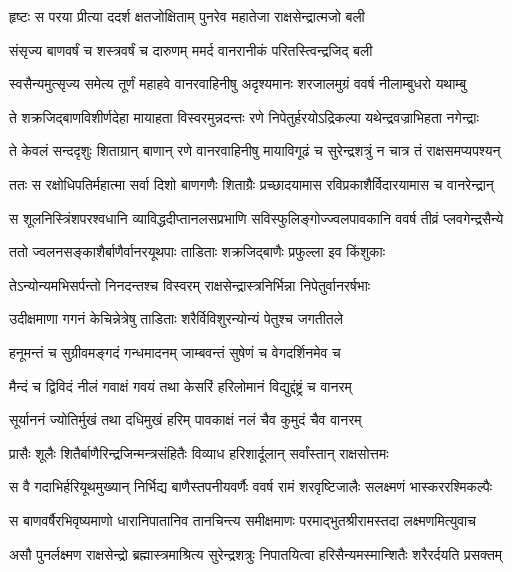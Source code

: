 \twolineshloka
{हृष्टः स परया प्रीत्या ददर्श क्षतजोक्षिताम्}
{पुनरेव महातेजा राक्षसेन्द्रात्मजो बली} %

\twolineshloka
{संसृज्य बाणवर्षं च शस्त्रवर्षं च दारुणम्}
{ममर्द वानरानीकं परितस्त्विन्द्रजिद् बली} %

\twolineshloka
{स्वसैन्यमुत्सृज्य समेत्य तूर्णं महाहवे वानरवाहिनीषु}
{अदृश्यमानः शरजालमुग्रं ववर्ष नीलाम्बुधरो यथाम्बु} %

\twolineshloka
{ते शक्रजिद्बाणविशीर्णदेहा मायाहता विस्वरमुन्नदन्तः}
{रणे निपेतुर्हरयोऽद्रिकल्पा यथेन्द्रवज्राभिहता नगेन्द्राः} %

\twolineshloka
{ते केवलं सन्ददृशुः शिताग्रान् बाणान् रणे वानरवाहिनीषु}
{मायाविगूढं च सुरेन्द्रशत्रुं न चात्र तं राक्षसमप्यपश्यन्} %

\twolineshloka
{ततः स रक्षोधिपतिर्महात्मा सर्वा दिशो बाणगणैः शिताग्रैः}
{प्रच्छादयामास रविप्रकाशैर्विदारयामास च वानरेन्द्रान्} %

\twolineshloka
{स शूलनिस्त्रिंशपरश्वधानि व्याविद्धदीप्तानलसप्रभाणि}
{सविस्फुलिङ्गोज्ज्वलपावकानि ववर्ष तीव्रं प्लवगेन्द्रसैन्ये} %

\twolineshloka
{ततो ज्वलनसङ्काशैर्बाणैर्वानरयूथपाः}
{ताडिताः शक्रजिद्बाणैः प्रफुल्ला इव किंशुकाः} %

\twolineshloka
{तेऽन्योन्यमभिसर्पन्तो निनदन्तश्च विस्वरम्}
{राक्षसेन्द्रास्त्रनिर्भिन्ना निपेतुर्वानरर्षभाः} %

\twolineshloka
{उदीक्षमाणा गगनं केचिन्नेत्रेषु ताडिताः}
{शरैर्विविशुरन्योन्यं पेतुश्च जगतीतले} %

\twolineshloka
{हनूमन्तं च सुग्रीवमङ्गदं गन्धमादनम्}
{जाम्बवन्तं सुषेणं च वेगदर्शिनमेव च} %

\twolineshloka
{मैन्दं च द्विविदं नीलं गवाक्षं गवयं तथा}
{केसरिं हरिलोमानं विद्युद्दंष्ट्रं च वानरम्} %

\twolineshloka
{सूर्याननं ज्योतिर्मुखं तथा दधिमुखं हरिम्}
{पावकाक्षं नलं चैव कुमुदं चैव वानरम्} %

\twolineshloka
{प्रासैः शूलैः शितैर्बाणैरिन्द्रजिन्मन्त्रसंहितैः}
{विव्याध हरिशार्दूलान् सर्वांस्तान् राक्षसोत्तमः} %

\twolineshloka
{स वै गदाभिर्हरियूथमुख्यान् निर्भिद्य बाणैस्तपनीयवर्णैः}
{ववर्ष रामं शरवृष्टिजालैः सलक्ष्मणं भास्कररश्मिकल्पैः} %

\twolineshloka
{स बाणवर्षैरभिवृष्यमाणो धारानिपातानिव तानचिन्त्य}
{समीक्षमाणः परमाद्भुतश्रीरामस्तदा लक्ष्मणमित्युवाच} %

\twolineshloka
{असौ पुनर्लक्ष्मण राक्षसेन्द्रो ब्रह्मास्त्रमाश्रित्य सुरेन्द्रशत्रुः}
{निपातयित्वा हरिसैन्यमस्मान्शितैः शरैरर्दयति प्रसक्तम्} %

